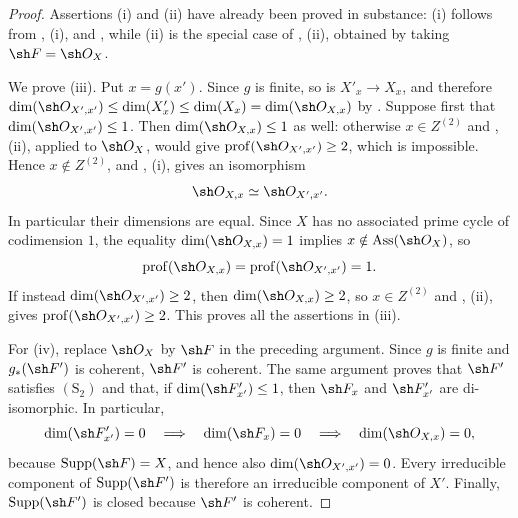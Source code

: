 \begin{proof}
Assertions {\rm(i)} and {\rm(ii)} have already been proved in
substance: {\rm(i)} follows from , {\rm(i)}, and
, while {\rm(ii)} is the special case of
, {\rm(ii)}, obtained by taking
$\sh F=\sh O_X$.

We prove {\rm(iii)}.  Put $x=g(x')$.  Since $g$ is finite, so is
$X'_x\to X_x$, and therefore $\dim(\sh O_{X',x'})
\leq \dim(X'_x)
\leq \dim(X_x)
=\dim(\sh O_{X,x})$
by .  Suppose first that
$\dim(\sh O_{X',x'})\leq1$.  Then
$\dim(\sh O_{X,x})\leq1$ as well: otherwise $x\in Z^{(2)}$ and
, {\rm(ii)}, applied to $\sh O_X$, would give $\operatorname{prof}(\sh O_{X',x'})\geq2$,
which is impossible.  Hence $x\notin Z^{(2)}$, and
, {\rm(i)}, gives an isomorphism
\[
  \sh O_{X,x}\simeq\sh O_{X',x'}.
\]
In particular their dimensions are equal.  Since $X$ has no
associated prime cycle of codimension $1$, the equality
$\dim(\sh O_{X,x})=1$ implies
$x\notin\operatorname{Ass}(\sh O_X)$, so
\[
  \operatorname{prof}(\sh O_{X,x})
  =\operatorname{prof}(\sh O_{X',x'})=1.
\]
If instead $\dim(\sh O_{X',x'})\geq2$, then
$\dim(\sh O_{X,x})\geq2$, so $x\in Z^{(2)}$ and
, {\rm(ii)}, gives $\operatorname{prof}(\sh O_{X',x'})\geq2$.
This proves all the assertions in {\rm(iii)}.


For {\rm(iv)}, replace $\sh O_X$ by $\sh F$ in the preceding
argument.  Since $g$ is finite and $g_*(\sh F')$ is coherent,
$\sh F'$ is coherent.  The same argument proves that $\sh F'$
satisfies $(\mathrm S_2)$ and that, if
$\dim(\sh F'_{x'})\leq1$, then $\sh F_x$ and
$\sh F'_{x'}$ are di-isomorphic.  In particular,
\[
  \dim(\sh F'_{x'})=0
  \quad\Longrightarrow\quad
  \dim(\sh F_x)=0
  \quad\Longrightarrow\quad
  \dim(\sh O_{X,x})=0,
\]
because $\operatorname{Supp}(\sh F)=X$, and hence also
$\dim(\sh O_{X',x'})=0$.  Every irreducible component of
$\operatorname{Supp}(\sh F')$ is therefore an irreducible
component of $X'$.  Finally, $\operatorname{Supp}(\sh F')$ is
closed because $\sh F'$ is coherent.
\end{proof}

